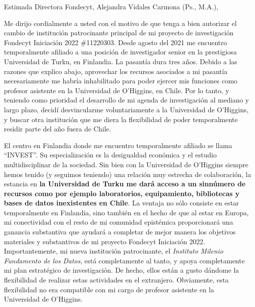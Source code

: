 \documentclass[9pt,stdletter,dateno,sigleft,openany]{newlfm} %
\begin{document}
\begin{newlfm}




\vspace{-2cm}
Estimada Directora Fondecyt, Alejandra Vidales Carmona (Ps., M.A.),

Me dirijo cordialmente a usted con el motivo de que tenga a bien autorizar el cambio de instituci\'on patrocinante principal de mi proyecto de investigaci\'on Fondecyt Iniciaci\'on 2022 \#11220303. Desde agosto del 2021 me encuentro temporalmente afiliado a una posici\'on de investigador senior en la prestigiosa Universidad de Turku, en Finlandia. La pasant\'ia dura tres a\~nos. Debido a las razones que explico abajo, aprovechar los recursos asociados a mi pasant\'ia necesariamente me habr\'ia inhabilitado para poder ejercer mis funciones como profesor asistente en la Universidad de O'Higgins, en Chile. Por lo tanto, y teniendo como prioridad el desarrollo de mi agenda de investigaci\'on al mediano y largo plazo, decid\'i desvincularme voluntariamente a la Universidad de O'Higgins, y buscar otra instituci\'on que me diera la flexibilidad de poder temporalmente residir parte del a\~no fuera de Chile. 


El centro en Finlandia donde me encuentro temporalmente afiliado se llama ``INVEST''. Su especializaci\'on es la desigualdad econ\'omica y el estudio multidisciplinar de la sociedad. Sin bien con la Universidad de O'Higgins siempre hemos tenido (y seguimos teniendo) una relaci\'on muy estrecha de colaboraci\'on, la estancia en {\bf la Universidad de Turku me dar\'a acceso a un sinn\'umero de recursos como por ejemplo laboratorios, equipamiento, bibliotecas y bases de datos inexistentes en Chile}. La ventaja no s\'olo consiste en estar temporalmente en Finlandia, sino tambi\'en en el hecho de que al estar en Europa, mi conectividad con el resto de mi comunidad epist\'emica proporcionar\'a una ganancia substantiva que ayudar\'a a completar de mejor manera los objetivos materiales y substantivos de mi proyecto Fondecyt Iniciaci\'on 2022. Importantemente, mi nueva instituci\'on patrocinante, el \emph{Instituto Milenio Fundamento de los Datos}, est\'a completamente al tanto, y apoya completamente mi plan estrat\'egico de investigaci\'on. De hecho, ellos est\'an a gusto d\'andome la flexibilidad de realizar estas actividades en el extranjero. Obviamente, esta flexibilidad no era compatible con mi cargo de profesor asistente en la Universidad de O'Higgins. 



\end{newlfm}
\end{document}
